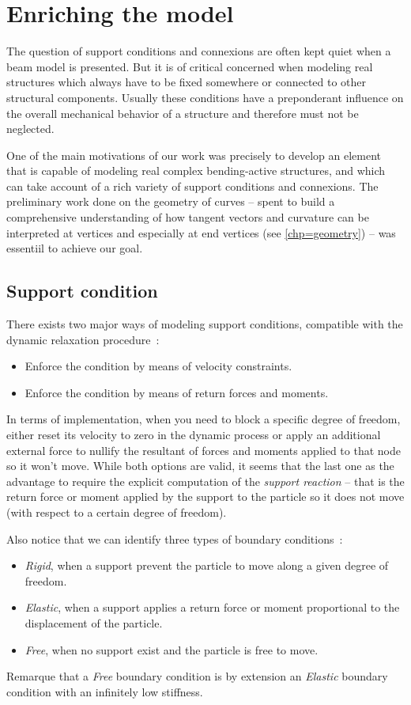 \section{Enriching the model}\label{sec=enriching}

The question of support conditions and connexions are often kept quiet when a beam model is presented. But it is of critical concerned when modeling real structures which always have to be fixed somewhere or connected to other structural components. Usually these conditions have a preponderant influence on the overall mechanical behavior of a structure and therefore must not be neglected.

One of the main motivations of our work was precisely to develop an element that is capable of modeling real complex bending-active structures, and which can take account of a rich variety of support conditions and connexions. The preliminary work done on the geometry of curves -- spent to build a comprehensive understanding of how tangent vectors and curvature can be interpreted at vertices and especially at end vertices (see \cref{chp=geometry}) -- was essentiil to achieve our goal.

\subsection{Support condition}
There exists two major ways of modeling support conditions, compatible with the dynamic relaxation procedure~:
\begin{itemize}
\item Enforce the condition by means of velocity constraints.
\item Enforce the condition by means of return forces and moments.
\end{itemize}

In terms of implementation, when you need to block a specific degree of freedom, either reset its velocity to zero in the dynamic process or apply an additional external force to nullify the resultant of forces and moments applied to that node so it won't move. While both options are valid, it seems that the last one as the advantage to require the explicit computation of the \emph{support reaction} -- that is the return force or moment applied by the support to the particle so it does not move (with respect to a certain degree of freedom).

Also notice that we can identify three types of boundary conditions~:
\begin{itemize}
\item \emph{Rigid}, when a support prevent the particle to move along a given degree of freedom.
\item \emph{Elastic}, when a support applies a return force or moment proportional to the displacement of the particle.
\item \emph{Free}, when no support exist and the particle is free to move.
\end{itemize}
Remarque that a \emph{Free} boundary condition is by extension an \emph{Elastic} boundary condition with an infinitely low stiffness.

